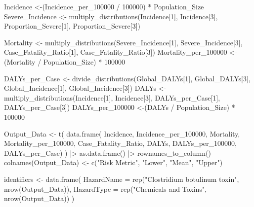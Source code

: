 \documentclass[
  letterpaper,
  DIV=11,
  numbers=noendperiod]{scrartcl}
\newenvironment{Shaded}{\begin{snugshade}}{\end{snugshade}}
\newcommand{\AttributeTok}[1]{\textcolor[rgb]{0.40,0.45,0.13}{#1}}
\newcommand{\DecValTok}[1]{\textcolor[rgb]{0.68,0.00,0.00}{#1}}
\newcommand{\FunctionTok}[1]{\textcolor[rgb]{0.28,0.35,0.67}{#1}}
\newcommand{\NormalTok}[1]{\textcolor[rgb]{0.00,0.23,0.31}{#1}}
\newcommand{\OtherTok}[1]{\textcolor[rgb]{0.00,0.23,0.31}{#1}}
\newcommand{\SpecialCharTok}[1]{\textcolor[rgb]{0.37,0.37,0.37}{#1}}
\newcommand{\StringTok}[1]{\textcolor[rgb]{0.13,0.47,0.30}{#1}}
\begin{document}
\begin{Shaded}
\begin{Highlighting}[]
\NormalTok{Incidence }\OtherTok{\textless{}{-}}\NormalTok{(Incidence\_per\_100000 }\SpecialCharTok{/} \DecValTok{100000}\NormalTok{) }\SpecialCharTok{*}\NormalTok{ Population\_Size}
\NormalTok{Severe\_Incidence }\OtherTok{\textless{}{-}} \FunctionTok{multiply\_distributions}\NormalTok{(Incidence[}\DecValTok{1}\NormalTok{],  Incidence[}\DecValTok{3}\NormalTok{],  Proportion\_Severe[}\DecValTok{1}\NormalTok{],  Proportion\_Severe[}\DecValTok{3}\NormalTok{])}

\NormalTok{Mortality }\OtherTok{\textless{}{-}} \FunctionTok{multiply\_distributions}\NormalTok{(Severe\_Incidence[}\DecValTok{1}\NormalTok{],  Severe\_Incidence[}\DecValTok{3}\NormalTok{],  Case\_Fatality\_Ratio[}\DecValTok{1}\NormalTok{],  Case\_Fatality\_Ratio[}\DecValTok{3}\NormalTok{])}
\NormalTok{Mortality\_per\_100000 }\OtherTok{\textless{}{-}}\NormalTok{ (Mortality }\SpecialCharTok{/}\NormalTok{ Population\_Size) }\SpecialCharTok{*} \DecValTok{100000}

\NormalTok{DALYs\_per\_Case }\OtherTok{\textless{}{-}} \FunctionTok{divide\_distributions}\NormalTok{(Global\_DALYs[}\DecValTok{1}\NormalTok{], Global\_DALYs[}\DecValTok{3}\NormalTok{],  Global\_Incidence[}\DecValTok{1}\NormalTok{], Global\_Incidence[}\DecValTok{3}\NormalTok{])}
\NormalTok{DALYs }\OtherTok{\textless{}{-}} \FunctionTok{multiply\_distributions}\NormalTok{(Incidence[}\DecValTok{1}\NormalTok{], Incidence[}\DecValTok{3}\NormalTok{],  DALYs\_per\_Case[}\DecValTok{1}\NormalTok{],  DALYs\_per\_Case[}\DecValTok{3}\NormalTok{])}
\NormalTok{DALYs\_per\_100000 }\OtherTok{\textless{}{-}}\NormalTok{(DALYs }\SpecialCharTok{/}\NormalTok{ Population\_Size) }\SpecialCharTok{*} \DecValTok{100000}

\NormalTok{Output\_Data }\OtherTok{\textless{}{-}} \FunctionTok{t}\NormalTok{(}
 \FunctionTok{data.frame}\NormalTok{(}
\NormalTok{ Incidence,  Incidence\_per\_100000, }
\NormalTok{ Mortality,  Mortality\_per\_100000, }
\NormalTok{ Case\_Fatality\_Ratio, }
\NormalTok{ DALYs,  DALYs\_per\_100000,  DALYs\_per\_Case)}
\NormalTok{ ) }\SpecialCharTok{|\textgreater{}} 
 \FunctionTok{as.data.frame}\NormalTok{() }\SpecialCharTok{|\textgreater{}} 
 \FunctionTok{rownames\_to\_column}\NormalTok{()}
\FunctionTok{colnames}\NormalTok{(Output\_Data) }\OtherTok{\textless{}{-}} \FunctionTok{c}\NormalTok{(}\StringTok{"Risk Metric"}\NormalTok{,  }\StringTok{"Lower"}\NormalTok{,  }\StringTok{"Mean"}\NormalTok{,  }\StringTok{"Upper"}\NormalTok{)}

\NormalTok{identifiers }\OtherTok{\textless{}{-}} \FunctionTok{data.frame}\NormalTok{(}
 \AttributeTok{HazardName =} \FunctionTok{rep}\NormalTok{(}\StringTok{"Clostridium botulinum toxin"}\NormalTok{,  }\FunctionTok{nrow}\NormalTok{(Output\_Data)), }
 \AttributeTok{HazardType =} \FunctionTok{rep}\NormalTok{(}\StringTok{"Chemicals and Toxins"}\NormalTok{,  }\FunctionTok{nrow}\NormalTok{(Output\_Data))}
\NormalTok{ )}
         


\end{Highlighting}
\end{Shaded}
\end{document}
